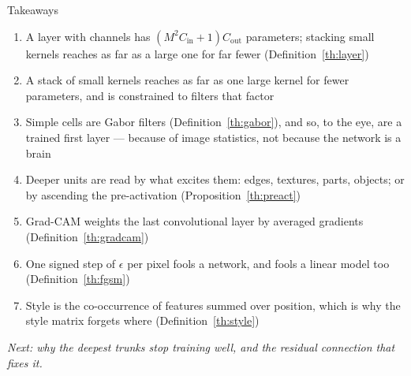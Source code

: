 \documentclass[aspectratio=169, 11pt]{beamer}
\newcommand{\bridge}[1]{%
  {\scriptsize\itshape\color{mcMuted} #1\par}\vspace{0.35em}}
\begin{document}
\begin{frame}{Takeaways}
  \vspace{-0.1em}
  {\scriptsize
  \begin{enumerate}\itemsep0.22em
    \item A layer with channels has $(M^2 C_{\mathrm{in}} + 1) C_{\mathrm{out}}$
          parameters; stacking small kernels reaches as far as a large
          one for far fewer (Definition~\ref{th:layer})
    \item A stack of small kernels reaches as far as one large kernel
          for fewer parameters, and is constrained to filters that
          factor
    \item Simple cells are Gabor filters (Definition~\ref{th:gabor}),
          and so, to the eye, are a trained first layer --- because of
          image statistics, not because the network is a brain
    \item Deeper units are read by what excites them: edges, textures,
          parts, objects; or by ascending the pre-activation
          (Proposition~\ref{th:preact})
    \item Grad-CAM weights the last convolutional layer by averaged
          gradients (Definition~\ref{th:gradcam})
    \item One signed step of $\epsilon$ per pixel fools a network, and
          fools a linear model too (Definition~\ref{th:fgsm})
    \item Style is the co-occurrence of features summed over position,
          which is why the style matrix forgets where
          (Definition~\ref{th:style})
  \end{enumerate}}
  \vspace{-0.2em}
  \bridge{Next: why the deepest trunks stop training well, and the
  residual connection that fixes it.}
\end{frame}
\end{document}
